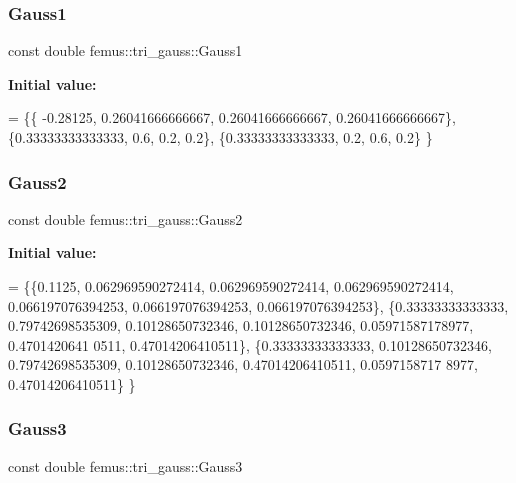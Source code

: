 \subsubsection{\texorpdfstring{Gauss1}{Gauss1}}
{\footnotesize\ttfamily const double femus\+::tri\+\_\+gauss\+::\+Gauss1\hspace{0.3cm}{\ttfamily [static]}}

{\bfseries Initial value\+:}
\begin{DoxyCode}
= \{\{ -0.28125, 0.26041666666667, 0.26041666666667, 0.26041666666667\},
    \{0.33333333333333, 0.6, 0.2, 0.2\},
    \{0.33333333333333, 0.2, 0.6, 0.2\}
  \}
\end{DoxyCode}
\mbox{\label{classfemus_1_1tri__gauss_abe733df39c92f92d3ae8f77dccd315ce}} 
\subsubsection{\texorpdfstring{Gauss2}{Gauss2}}
{\footnotesize\ttfamily const double femus\+::tri\+\_\+gauss\+::\+Gauss2\hspace{0.3cm}{\ttfamily [static]}}

{\bfseries Initial value\+:}
\begin{DoxyCode}
= \{\{0.1125, 0.062969590272414, 0.062969590272414, 0.062969590272414, 0.066197076394253, 0.066197076394253, 
      0.066197076394253\},
    \{0.33333333333333, 0.79742698535309, 0.10128650732346, 0.10128650732346, 0.05971587178977, 0.4701420641
      0511, 0.47014206410511\},
    \{0.33333333333333, 0.10128650732346, 0.79742698535309, 0.10128650732346, 0.47014206410511, 0.0597158717
      8977, 0.47014206410511\}
  \}
\end{DoxyCode}
\mbox{\label{classfemus_1_1tri__gauss_a32b1a6dbc2e4f4d27f8939250b5611b6}} 
\subsubsection{\texorpdfstring{Gauss3}{Gauss3}}
{\footnotesize\ttfamily const double femus\+::tri\+\_\+gauss\+::\+Gauss3\hspace{0.3cm}{\ttfamily [static]}}

